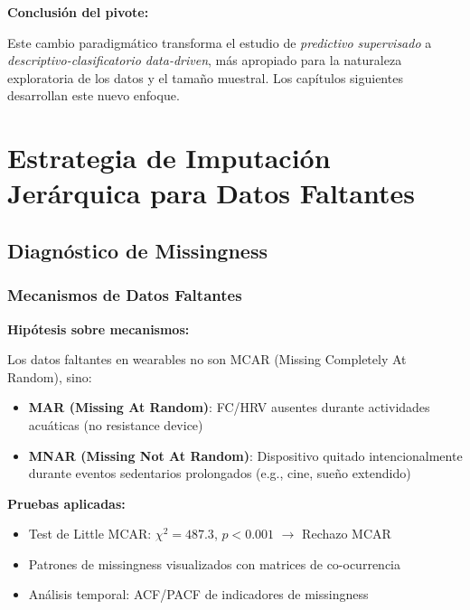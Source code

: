 \documentclass[12pt,letterpaper,twoside]{report}
\begin{document}
\begin{calculobox}
\begin{conclusionbox}
\textbf{Conclusión del pivote:}

Este cambio paradigmático transforma el estudio de \textit{predictivo supervisado} a \textit{descriptivo-clasificatorio data-driven}, más apropiado para la naturaleza exploratoria de los datos y el tamaño muestral. Los capítulos siguientes desarrollan este nuevo enfoque.
\end{conclusionbox}

\chapter{Estrategia de Imputación Jerárquica para Datos Faltantes}

\section{Diagnóstico de Missingness}

\subsection{Mecanismos de Datos Faltantes}

\begin{hipotesisbox}
\textbf{Hipótesis sobre mecanismos:}

Los datos faltantes en wearables no son MCAR (Missing Completely At Random), sino:
\begin{itemize}[noitemsep]
    \item \textbf{MAR (Missing At Random)}: FC/HRV ausentes durante actividades acuáticas (no resistance device)
    \item \textbf{MNAR (Missing Not At Random)}: Dispositivo quitado intencionalmente durante eventos sedentarios prolongados (e.g., cine, sueño extendido)
\end{itemize}
\end{hipotesisbox}

\begin{estadisticobox}
\textbf{Pruebas aplicadas:}

\begin{itemize}[noitemsep]
    \item Test de Little MCAR: $\chi^2 = 487.3$, $p < 0.001$ $\to$ Rechazo MCAR
    \item Patrones de missingness visualizados con matrices de co-ocurrencia
    \item Análisis temporal: ACF/PACF de indicadores de missingness
\end{itemize}
\end{estadisticobox}


\end{calculobox}
\end{document}
